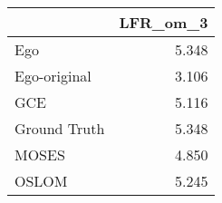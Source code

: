 \begin{tabular}{lr}
\toprule
{} & LFR_om_3 \\
\midrule
Ego          &    5.348 \\
Ego-original &    3.106 \\
GCE          &    5.116 \\
Ground Truth &    5.348 \\
MOSES        &    4.850 \\
OSLOM        &    5.245 \\
\bottomrule
\end{tabular}
